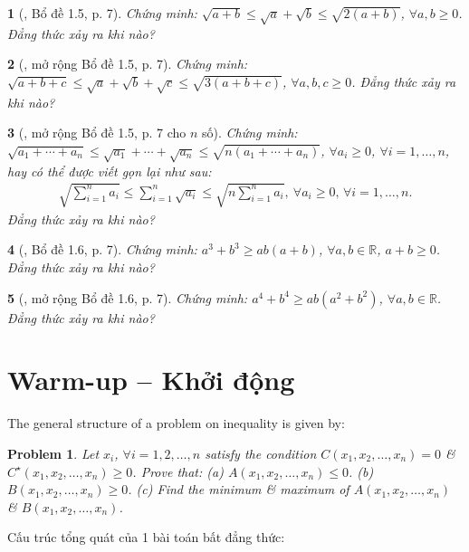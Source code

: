 \documentclass{article}
\newtheorem{baitoan}{}
\newtheorem{problem}{Problem}
\begin{document}
\begin{baitoan}[\cite{Son_Nghiep_Trung_Can_bdt}, Bổ đề 1.5, p. 7]
	Chứng minh: $\sqrt{a + b}\le\sqrt{a} + \sqrt{b}\le\sqrt{2(a + b)}$, $\forall a,b\ge 0$. Đẳng thức xảy ra khi nào?
\end{baitoan}

\begin{baitoan}[\cite{Son_Nghiep_Trung_Can_bdt}, mở rộng Bổ đề 1.5, p. 7]
	Chứng minh: $\sqrt{a + b + c}\le\sqrt{a} + \sqrt{b} + \sqrt{c}\le\sqrt{3(a + b + c)}$, $\forall a,b,c\ge 0$. Đẳng thức xảy ra khi nào?
\end{baitoan}

\begin{baitoan}[\cite{Son_Nghiep_Trung_Can_bdt}, mở rộng Bổ đề 1.5, p. 7 cho $n$ số]
	Chứng minh: $\sqrt{a_1 + \cdots + a_n}\le\sqrt{a_1} + \cdots + \sqrt{a_n}\le\sqrt{n(a_1 + \cdots + a_n)}$, $\forall a_i\ge 0$, $\forall i = 1,\ldots,n$, hay có thể được viết gọn lại như sau:
	\begin{align*}
		\sqrt{\sum_{i=1}^n a_i}\le\sum_{i=1}^n \sqrt{a_i}\le\sqrt{n\sum_{i=1}^n a_i},\ \forall a_i\ge 0,\,\forall i = 1,\ldots,n.
	\end{align*}
	Đẳng thức xảy ra khi nào?
\end{baitoan}

\begin{baitoan}[\cite{Son_Nghiep_Trung_Can_bdt}, Bổ đề 1.6, p. 7]
	Chứng minh: $a^3 + b^3\ge ab(a + b)$, $\forall a,b\in\mathbb{R}$, $a + b\ge 0$. Đẳng thức xảy ra khi nào?
\end{baitoan}

\begin{baitoan}[\cite{Son_Nghiep_Trung_Can_bdt}, mở rộng Bổ đề 1.6, p. 7]
	Chứng minh: $a^4 + b^4\ge ab(a^2 + b^2)$, $\forall a,b\in\mathbb{R}$. Đẳng thức xảy ra khi nào?
\end{baitoan}


\section{Warm-up -- Khởi động}
The general structure of a problem on inequality is given by:

\begin{problem}
	Let $x_i$, $\forall i = 1,2,\ldots,n$ satisfy the condition $C(x_1,x_2,\ldots,x_n) = 0$ \& $C^\star(x_1,x_2,\ldots,x_n)\ge0$. Prove that: (a) $A(x_1,x_2,\ldots,x_n)\le0$. (b) $B(x_1,x_2,\ldots,x_n)\ge0$. (c) Find the minimum \& maximum of $A(x_1,x_2,\ldots,x_n)$ \& $B(x_1,x_2,\ldots,x_n)$.
\end{problem}
Cấu trúc tổng quát của 1 bài toán bất đẳng thức:
\end{document}
